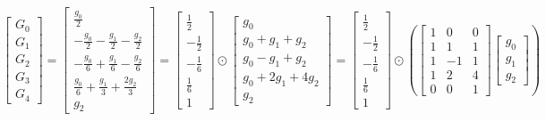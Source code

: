 \documentclass{article}%
\begin{document}
\[%
\left[\begin{matrix}G_{0}\\G_{1}\\G_{2}\\G_{3}\\G_{4}\end{matrix}\right] = \left[\begin{matrix}\frac{g_{0}}{2}\\- \frac{g_{0}}{2} - \frac{g_{1}}{2} - \frac{g_{2}}{2}\\- \frac{g_{0}}{6} + \frac{g_{1}}{6} - \frac{g_{2}}{6}\\\frac{g_{0}}{6} + \frac{g_{1}}{3} + \frac{2 g_{2}}{3}\\g_{2}\end{matrix}\right] = \left[\begin{matrix}\frac{1}{2}\\- \frac{1}{2}\\- \frac{1}{6}\\\frac{1}{6}\\1\end{matrix}\right] \odot \left[\begin{matrix}g_{0}\\g_{0} + g_{1} + g_{2}\\g_{0} - g_{1} + g_{2}\\g_{0} + 2 g_{1} + 4 g_{2}\\g_{2}\end{matrix}\right] = \left[\begin{matrix}\frac{1}{2}\\- \frac{1}{2}\\- \frac{1}{6}\\\frac{1}{6}\\1\end{matrix}\right] \odot \left( \left[\begin{matrix}1 & 0 & 0\\1 & 1 & 1\\1 & -1 & 1\\1 & 2 & 4\\0 & 0 & 1\end{matrix}\right] \left[\begin{matrix}g_{0}\\g_{1}\\g_{2}\end{matrix}\right] \right)%
\]%
\end{document}
